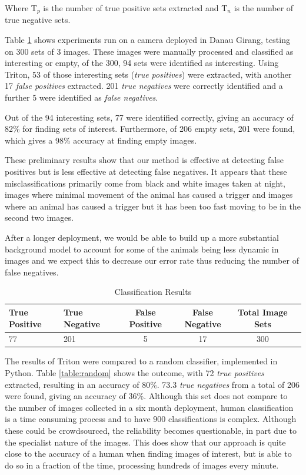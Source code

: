 		Where T$_{p}$  is the number of true positive sets extracted and T$_{n}$  is the number of true negative sets.
		
		Table \ref{table:processing} shows experiments run on a camera deployed in Danau Girang, testing on 300 sets of 3 images. These images were manually processed and classified as interesting or empty, of the 300, 94 sets were identified as interesting. Using Triton, 53 of those interesting sets (\textit{true positives}) were extracted, with another 17 \textit{false positives} extracted. 201 \textit{true negatives} were correctly identified and a further 5 were identified as \textit{false negatives}. 
		
		Out of the 94 interesting sets, 77 were identified correctly, giving an accuracy of 82\% for finding sets of interest. Furthermore, of 206 empty sets, 201 were found, which gives a 98\% accuracy at finding empty images.
	
		These preliminary results show that our method is effective at detecting false positives but is less effective at detecting false negatives. It appears that these misclassifications primarily come from black and white images taken at night, images where minimal movement of the animal has caused a trigger and images where an animal has caused a trigger but it has been too fast moving to be in the second two images.
		
		After a longer deployment, we would be able to build up a more substantial background model to account for some of the animals being less dynamic in images and we expect this to decrease our error rate thus reducing the number of false negatives. 
		
		\begin{table}
			\hfill{}
			\begin{tabular}{|l|l|c|c|c|c|}
				\hline
					True Positive & True Negative & False Positive  & False Negative & Total Image Sets \\
				\hline
					77 & 201 & 5 & 17 & 300 \\
				\hline
			\end{tabular}
			\hfill{}
			\caption{Classification Results}
			\label{table:processing}
		\end{table}
		
		The results of Triton were compared to a random classifier, implemented in Python. Table \ref{table:random} shows the outcome, with 72 \textit{true positives} extracted, resulting in an accuracy of 80\%. 73.3 \textit{true negatives} from a total of 206 were found, giving an accuracy of 36\%. Although this set does not compare to the number of images collected in a six month deployment, human classification is a time consuming process and to have 900 classifications is complex. Although these could be crowdsourced, the reliability becomes questionable, in part due to the specialist nature of the images. This does show that our approach is quite close to the accuracy of a human when finding images of interest, but is able to do so in a fraction of the time, processing hundreds of images every minute. 
		
